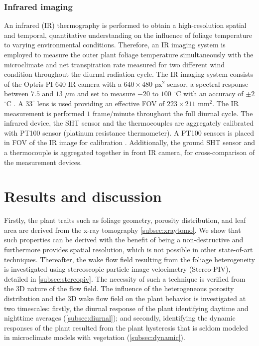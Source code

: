 \subsubsection*{Infrared imaging}
An infrared (IR) thermography is performed to obtain a high-resolution spatial and temporal, quantitative understanding on the influence of foliage temperature to varying environmental conditions. Therefore, an IR imaging system is employed to measure the outer plant foliage temperature simultaneously with the microclimate and net transpiration rate measured for two different wind condition throughout the diurnal radiation cycle. The IR imaging system consists of the Optris PI 640 IR camera with a $640\times480$ px$^2$ sensor, a spectral response between $7.5$ and $13$ $\mu$m and set to measure $-20$ to $100$ $^{\circ}$C with an accuracy of $\pm2$ $^{\circ}$C \citep{Allegrini2018,Tsalicoglou2018}. A $33^{\circ}$ lens is used providing an effective FOV of $223\times211$ mm$^2$. The IR measurement is performed $1$ frame/minute throughout the full diurnal cycle. The infrared device, the SHT sensor and the thermocouples are aggregately calibrated with PT100 sensor (platinum resistance thermometer). A PT100 sensors is placed in FOV of the IR image for calibration \citep{Allegrini2018}. Additionally, the ground SHT sensor and a thermocouple is aggregated together in front IR camera, for cross-comparison of the measurement devices.


\section{Results and discussion}

Firstly, the plant traits such as foliage geometry, porosity distribution, and leaf area are derived from the x-ray tomography \cref{subsec:xraytomo}. We show that such properties can be derived with the benefit of being a non-destructive and furthermore provides spatial resolution, which is not possible in other state-of-art techniques. Thereafter, the wake flow field resulting from the foliage heterogeneity is investigated using stereoscopic particle image velocimetry (Stereo-PIV), detailed in \cref{subsec:stereopiv}. The necessity of such a technique is verified from the 3D nature of the flow field. The influence of the heterogeneous porosity distribution and the 3D wake flow field on the plant behavior is investigated at two timescales: firstly, the diurnal response of the plant identifying daytime and nighttime averages (\cref{subsec:diurnal}); and secondly, identifying the dynamic responses of the plant resulted from the plant hysteresis that is seldom modeled in microclimate models with vegetation (\cref{subsec:dynamic}). 

